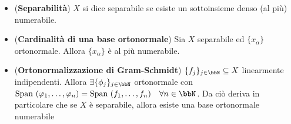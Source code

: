 \documentclass[a4paper,NoNotes,GeneralMath]{stdmdoc}
\begin{document}
\begin{itemize}
        \item ({\bf Separabilità}) $X$ si dice separabile se esiste un sottoinsieme denso (al più) numerabile.
        \item ({\bf Cardinalità di una base ortonormale}) Sia $X$ separabile ed $\{x_\alpha\}$ ortonormale. Allora $\{x_\alpha\}$ è al più numerabile.
        \item ({\bf Ortonormalizzazione di Gram-Schmidt}) $\{f_j\}_{j \in \bbN} \subseteq X$ linearmente indipendenti. Allora $\exists \{\phi_j\}_{j \in \bbN}$ ortonormale con $\Span(\varphi_1, \ldots, \varphi_n) = \Span(f_1, \ldots, f_n) \quad \forall n \in \bbN$. Da ciò deriva in particolare che se $X$ è separabile, allora esiste una base ortonormale numerabile
          
        \end{itemize}
        
\end{document}

